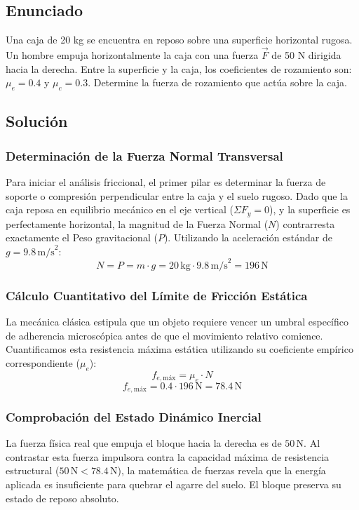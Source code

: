 \documentclass[12pt]{article}
\begin{document}
\newpage

\subsection*{Enunciado}
Una caja de 20 kg se encuentra en reposo sobre una superficie horizontal rugosa. Un hombre empuja horizontalmente la caja con una fuerza $\vec{F}$ de 50 N dirigida hacia la derecha. Entre la superficie y la caja, los coeficientes de rozamiento son: $\mu_e = 0.4$ y $\mu_c = 0.3$. Determine la fuerza de rozamiento que actúa sobre la caja.

\subsection*{Solución}

\subsubsection*{Determinación de la Fuerza Normal Transversal}
Para iniciar el análisis friccional, el primer pilar es determinar la fuerza de soporte o compresión perpendicular entre la caja y el suelo rugoso. Dado que la caja reposa en equilibrio mecánico en el eje vertical ($\Sigma F_y = 0$), y la superficie es perfectamente horizontal, la magnitud de la Fuerza Normal ($N$) contrarresta exactamente el Peso gravitacional ($P$).
Utilizando la aceleración estándar de $g = 9.8 \, \text{m/s}^2$:
\begin{equation}
    N = P = m \cdot g = 20 \, \text{kg} \cdot 9.8 \, \text{m/s}^2 = 196 \, \text{N}
\end{equation}

\subsubsection*{Cálculo Cuantitativo del Límite de Fricción Estática}
La mecánica clásica estipula que un objeto requiere vencer un umbral específico de adherencia microscópica antes de que el movimiento relativo comience. Cuantificamos esta resistencia máxima estática utilizando su coeficiente empírico correspondiente ($\mu_e$):
\begin{equation}
    f_{e,\text{máx}} = \mu_e \cdot N
\end{equation}
\begin{equation}
    f_{e,\text{máx}} = 0.4 \cdot 196 \, \text{N} = 78.4 \, \text{N}
\end{equation}

\subsubsection*{Comprobación del Estado Dinámico Inercial}
La fuerza física real que empuja el bloque hacia la derecha es de $50 \, \text{N}$. Al contrastar esta fuerza impulsora contra la capacidad máxima de resistencia estructural ($50 \, \text{N} < 78.4 \, \text{N}$), la matemática de fuerzas revela que la energía aplicada es insuficiente para quebrar el agarre del suelo. El bloque preserva su estado de reposo absoluto. 
\end{document}
